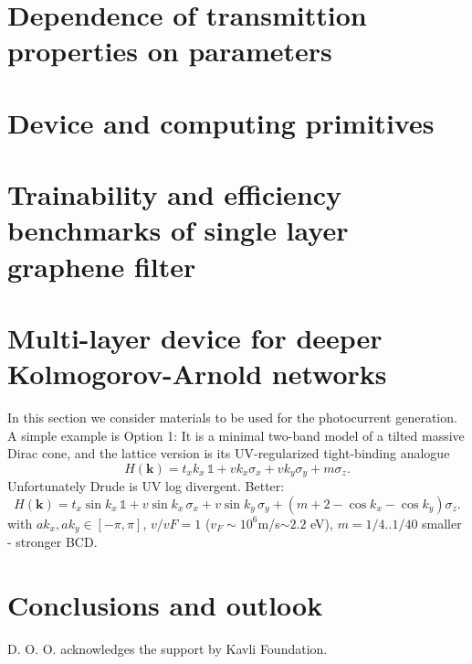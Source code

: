 \documentclass[twocolumn,aps,prb,superscriptaddress,longbibliography]{revtex4-2}
\begin{document}
\section{Dependence of transmittion properties on parameters}

\section{Device and computing primitives}


\section{Trainability and efficiency benchmarks of single layer graphene filter}

\section{Multi-layer device for deeper Kolmogorov-Arnold networks}
In this section we consider materials to be used for the photocurrent generation. A simple example is Option 1:
It is a minimal two-band model of a tilted massive Dirac cone, and the lattice version is its UV-regularized tight-binding analogue
\begin{equation}
H(\mathbf{k})=t_x k_x\,\mathbb{1}+v k_x \sigma_x+v k_y \sigma_y+m \sigma_z .
\end{equation}
Unfortunately Drude is UV log divergent. Better:
\begin{equation}
H(\mathbf{k})=t_x \sin k_x\,\mathbb{1}+v \sin k_x\,\sigma_x+v \sin k_y\,\sigma_y+\left(m+2-\cos k_x-\cos k_y\right)\sigma_z .
\end{equation}
with $a k_x,a k_y \in [-\pi, \pi]$, $v/vF =1$ ($v_F\sim 10^6$m/s$\sim 2.2$ eV), $m=1/4..1/40$ smaller - stronger BCD. 

\section{Conclusions and outlook}


\begin{acknowledgements}
D. O. O. acknowledges the support by Kavli Foundation.
\end{acknowledgements}




%
\end{document}
